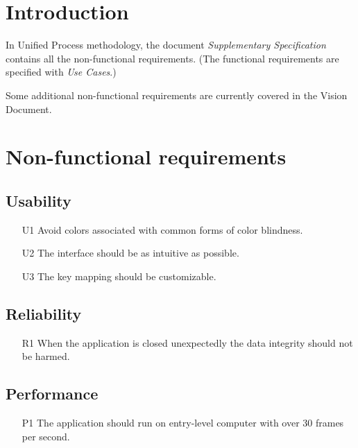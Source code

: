 \documentclass[fontsize=12pt,
               paper=a4,
               twoside=false,
               parskip=half,
               ]{scrartcl}
\begin{document}
\newcommand{\doctitle}{Supplementary Specification}


\tableofcontents

\listoffigures

\newpage

\section{Introduction}
In Unified Process methodology, the document \emph{Supplementary Specification} contains all the non-functional requirements. (The functional requirements are specified with \emph{Use Cases}.)

Some additional non-functional requirements are currently covered in the Vision Document.

\section{Non-functional requirements}

\subsection{Usability}
\begin{itemize}
	\item[U1] Avoid colors associated with common forms of color blindness.
	\item[U2] The interface should be as intuitive as possible.
	\item[U3] The key mapping should be customizable.
\end{itemize}

\subsection{Reliability}
\begin{itemize}
	\item[R1] When the application is closed unexpectedly the data integrity should not be harmed.
\end{itemize}

\subsection{Performance}
\begin{itemize}
	\item[P1] The application should run on entry-level computer with over 30 frames per second.
\end{itemize}
\end{document}
